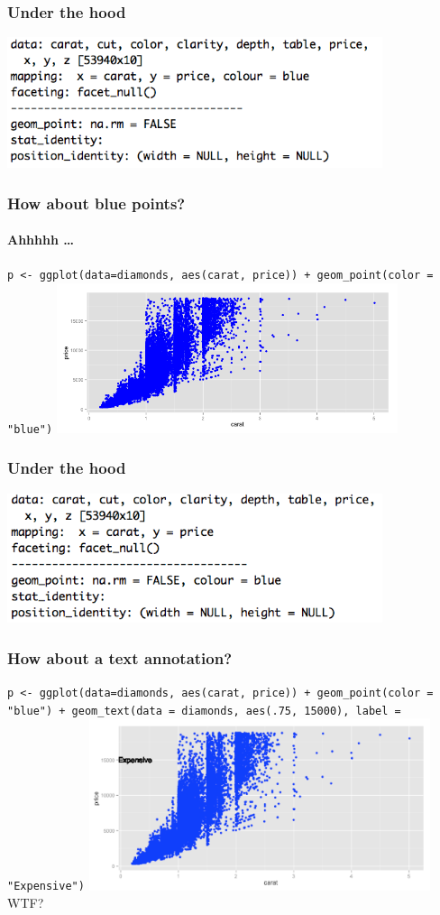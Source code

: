 \documentclass{beamer}
\begin{document}
\begin{frame}\frametitle{Under the hood}
\includegraphics[width=110mm,scale=0.5]{bluemap.png}
\end{frame}


\begin{frame}\frametitle{How about blue points?}
\framesubtitle{Ahhhhh \ldots}
\footnotesize\texttt{p <- ggplot(data=diamonds, aes(carat, price)) + geom\_point(color = "blue")} 
\includegraphics[width=100mm,scale=0.5]{qplotbluefixed.png}
\end{frame}

\begin{frame}\frametitle{Under the hood}
\includegraphics[width=110mm,scale=0.5]{bluemapcorrect.png}
\end{frame}


\begin{frame}\frametitle{How about a text annotation?}
\footnotesize\texttt{p <- ggplot(data=diamonds, aes(carat, price)) + geom\_point(color = "blue") +  geom\_text(data = diamonds, aes(.75, 15000), label = "Expensive")} 
\includegraphics[width=100mm,scale=0.5]{wrongannotate.png} 
\alert{WTF?}
\end{frame}
\end{document}
